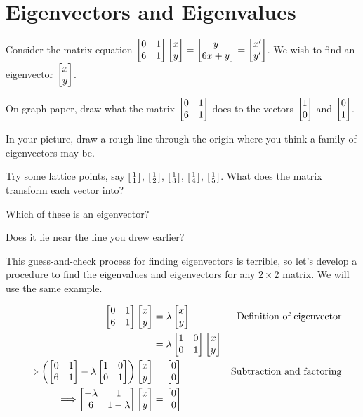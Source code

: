 \documentclass[../gatm_answers.tex]{subfiles}
\begin{document}
\section{Eigenvectors and Eigenvalues}

\begin{outer_problem}[start=1]
\item Consider the matrix equation $\begin{bmatrix} 0 & 1 \\ 6 & 1 \end{bmatrix}\begin{bmatrix} x \\ y \end{bmatrix} = \begin{bmatrix} y \\ 6x+y \end{bmatrix}=\begin{bmatrix} x' \\ y' \end{bmatrix}$. We wish to find an eigenvector $\begin{bmatrix} x \\ y \end{bmatrix}$.
\end{outer_problem}

\begin{inner_problem}[start=1]
\item On graph paper, draw what the matrix $\begin{bmatrix} 0 & 1 \\ 6 & 1 \end{bmatrix}$ does to the vectors $\begin{bmatrix} 1 \\ 0 \end{bmatrix}$ and $\begin{bmatrix} 0 \\ 1 \end{bmatrix}$.
\end{inner_problem}

\begin{inner_problem}
\item In your picture, draw a rough line through the origin where you think a family of eigenvectors may be.
\end{inner_problem}

\begin{inner_problem}
\item Try some lattice points, say $\left[\begin{smallmatrix} 1 \\ 1 \end{smallmatrix}\right]$, $\left[\begin{smallmatrix} 1 \\ 2 \end{smallmatrix}\right]$, $\left[\begin{smallmatrix} 1 \\ 3 \end{smallmatrix}\right]$, $\left[\begin{smallmatrix} 1 \\ 4 \end{smallmatrix}\right]$, $\left[\begin{smallmatrix} 1 \\ 5 \end{smallmatrix}\right]$. What does the matrix transform each vector into?
\end{inner_problem}

\begin{inner_problem}
\item Which of these is an eigenvector?
\end{inner_problem}

\begin{inner_problem}
\item Does it lie near the line you drew earlier?
\end{inner_problem}

\begin{outer_problem}
\item This guess-and-check process for finding eigenvectors is terrible, so let's develop a procedure to find the eigenvalues and eigenvectors for any $2\times 2$ matrix. We will use the same example.

\begin{align*}
\begin{bmatrix} 0 & 1 \\ 6 & 1 \end{bmatrix}\begin{bmatrix} x \\ y \end{bmatrix} &= \lambda\begin{bmatrix} x \\ y \end{bmatrix} & \text{Definition of eigenvector} \\
&= \lambda\begin{bmatrix} 1 & 0 \\ 0 & 1 \end{bmatrix}\begin{bmatrix} x \\ y \end{bmatrix} \\
\Longrightarrow \left(\begin{bmatrix} 0 & 1 \\ 6 & 1 \end{bmatrix}-\lambda\begin{bmatrix} 1 & 0 \\ 0 & 1 \end{bmatrix}\right)\begin{bmatrix} x \\ y \end{bmatrix}&=\begin{bmatrix} 0 \\ 0 \end{bmatrix} & \text{Subtraction and factoring} \\
\Longrightarrow \begin{bmatrix} -\lambda & 1 \\ 6 & 1-\lambda \end{bmatrix}\begin{bmatrix} x \\ y \end{bmatrix} &= \begin{bmatrix} 0 \\ 0 \end{bmatrix}
\end{align*}
\end{outer_problem}
\end{document}
